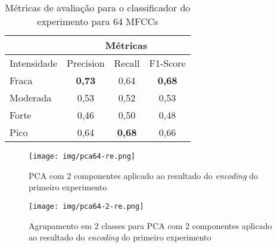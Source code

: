 \begin{table}%
    \centering
    \begin{tabular}{l|ccc|}
        \cline{2-4}
                                      & \multicolumn{3}{c|}{Métricas}                                                               \\ \hline
            \multicolumn{1}{|l|}{Intensidade} & \multicolumn{1}{c|}{Precision}      & \multicolumn{1}{c|}{Recall}           & F1-Score      \\ \hline
            \multicolumn{1}{|l|}{Fraca}       & \multicolumn{1}{c|}{\textbf{0,73}}  & \multicolumn{1}{c|}{0,64}             & \textbf{0,68} \\ \hline
            \multicolumn{1}{|l|}{Moderada}    & \multicolumn{1}{c|}{0,53}           & \multicolumn{1}{c|}{0,52}             & 0,53          \\ \hline
            \multicolumn{1}{|l|}{Forte}       & \multicolumn{1}{c|}{0,46}           & \multicolumn{1}{c|}{0,50}              & 0,48          \\ \hline
            \multicolumn{1}{|l|}{Pico}        & \multicolumn{1}{c|}{0,64}           & \multicolumn{1}{c|}{\textbf{0,68}}    & 0,66          \\ \hline
        \end{tabular}
    \caption{\label{table:metricasclf64}Métricas de avaliação para o classificador do experimento para 64 \acrshort{MFCC}s}
\end{table}

\begin{figure}%
    \centering
    \texttt{[image: img/pca64-re.png]}
    \caption{\label{fig:pca64}\acrshort{PCA} com 2 componentes aplicado ao resultado do \textit{encoding} do primeiro experimento}
\end{figure}

\begin{figure}%
    \centering
    \texttt{[image: img/pca64-2-re.png]}
    \caption{\label{fig:pca64-2}Agrupamento em 2 classes para \acrshort{PCA} com 2 componentes aplicado ao resultado do \textit{encoding} do primeiro experimento}
\end{figure}
